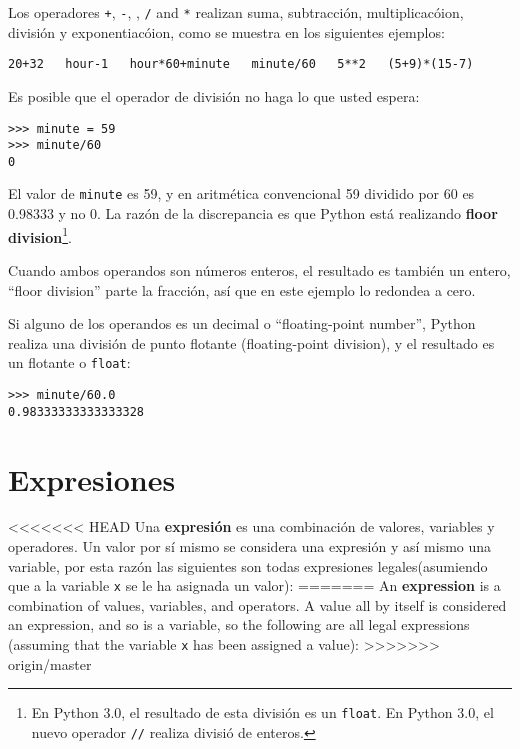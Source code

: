 Los operadores {\tt +}, {\tt -}, {\tt *}, {\tt /} and {\tt **}
realizan suma, subtracci\'on, multiplicac\'oion, divisi\'on y
exponentiac\'oion, como se muestra en los siguientes ejemplos:

\beforeverb
\begin{verbatim}
20+32   hour-1   hour*60+minute   minute/60   5**2   (5+9)*(15-7)
\end{verbatim}
\afterverb
%
Es posible que el operador de divisi\'on no haga lo que usted espera:

\beforeverb
\begin{verbatim}
>>> minute = 59
>>> minute/60
0
\end{verbatim}
\afterverb
%
El valor de {\tt minute} es 59, y en aritm\'etica convencional 59
dividido por 60 es 0.98333 y no 0.  La raz\'on de la discrepancia es que Python est\'a realizando {\bf floor division}\footnote{En Python 3.0,
el resultado de esta divisi\'on es un {\tt float}.  
En Python 3.0, el nuevo operador
{\tt //} realiza divisi\'o de enteros.}.


Cuando ambos operandos son n\'umeros enteros, el resultado es tambi\'en un entero, ``floor division'' parte la fracci\'on, as\'i que en este ejemplo lo redondea a cero.

Si alguno de los operandos es un decimal o ``floating-point number'', Python realiza una 
divisi\'on de punto flotante (floating-point division), y el resultado es un flotante o {\tt float}:

\beforeverb
\begin{verbatim}
>>> minute/60.0
0.98333333333333328
\end{verbatim}
\afterverb


\section{Expresiones}

<<<<<<< HEAD
Una {\bf expresi\'on} es una combinaci\'on de valores, variables y operadores.
Un valor por s\'i mismo se considera una expresi\'on y as\'i mismo una variable, por esta raz\'on las siguientes son todas expresiones legales(asumiendo que a la variable {\tt x} se le ha asignada un valor):
=======
An {\bf expression} is a combination of values, variables, and operators.
A value all by itself is considered an expression, and so is
a variable, so the following are all legal expressions
(assuming that the variable {\tt x} has been assigned a value):
>>>>>>> origin/master


